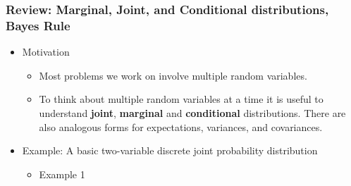 \documentclass[10pt,containsverbatim,paralist]{article}
\begin{document}
\subsubsection*{Review: Marginal, Joint, and Conditional distributions, Bayes Rule}
\label{sec-1-1-3}
\begin{itemize}
\item Motivation
\label{sec-1-1-3-1}
\begin{itemize}
\item Most problems we work on involve multiple random variables.
\item To think about multiple random variables at a time it is useful to understand \textbf{joint}, \textbf{marginal} and \textbf{conditional}
  distributions.  There are also analogous forms for expectations, variances, and covariances.
\end{itemize}
\item Example: A basic two-variable discrete joint probability distribution
\label{sec-1-1-3-2}
\begin{itemize}
\item Example 1
\label{sec-1-1-3-2-1}


\end{itemize}
\end{itemize}
\end{document}
